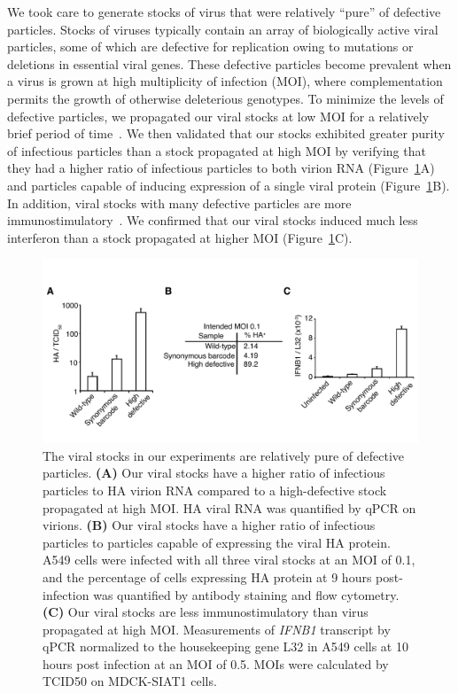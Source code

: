 \documentclass[9pt,lineno]{elife}
\begin{document}
We took care to generate stocks of virus that were relatively ``pure'' of defective particles.
Stocks of viruses typically contain an array of biologically active viral particles, some of which are defective for replication owing to mutations or deletions in essential viral genes.
These defective particles become prevalent when a virus is grown at high multiplicity of infection (MOI), where complementation permits the growth of otherwise deleterious genotypes.
To minimize the levels of defective particles, we propagated our viral stocks at low MOI for a relatively brief period of time~\citep{xue2016propagation}.
We then validated that our stocks exhibited greater purity of infectious particles than a stock propagated at high MOI by verifying that they had a higher ratio of infectious particles to both virion RNA (Figure~\ref{fig:viruspopulations}A) and particles capable of inducing expression of a single viral protein (Figure~\ref{fig:viruspopulations}B).
In addition, viral stocks with many defective particles are more immunostimulatory~\citep{tapia2013defective}.
We confirmed that our viral stocks induced much less interferon than a stock propagated at higher MOI (Figure~\ref{fig:viruspopulations}C).

\begin{figure}
\centerline{\includegraphics[width=0.7\linewidth]{figures/Validating_barcode_virus/validating_populations_D02.pdf}}
\caption{\label{fig:viruspopulations} The viral stocks in our experiments are relatively pure of defective particles. 
{\bf (A)}
Our viral stocks have a higher ratio of infectious particles to HA virion RNA compared to a high-defective stock propagated at high MOI.
HA viral RNA was quantified by qPCR on virions. 
{\bf (B)} 
Our viral stocks have a higher ratio of infectious particles to particles capable of expressing the viral HA protein.
A549 cells were infected with all three viral stocks at an MOI of 0.1, and the percentage of cells expressing HA protein at 9 hours post-infection was quantified by antibody staining and flow cytometry.
{\bf (C)} 
Our viral stocks are less immunostimulatory than virus propagated at high MOI. 
Measurements of \textit{IFNB1} transcript by qPCR normalized to the housekeeping gene L32 in A549 cells at 10 hours post infection at an MOI of 0.5.
MOIs were calculated by TCID50 on MDCK-SIAT1 cells.}
\end{figure}
\end{document}

